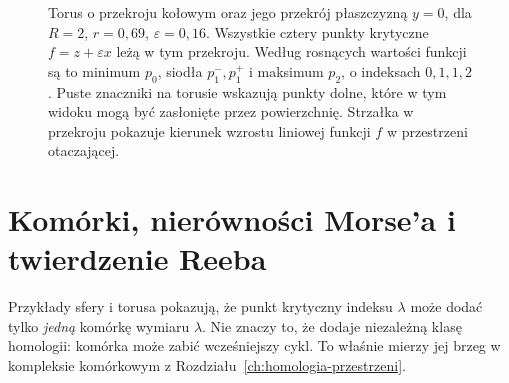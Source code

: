 \begin{figure}[H]
\caption{Torus o przekroju kołowym oraz jego przekrój płaszczyzną $y=0$,
dla $R=2$, $r=0{,}69$, $\varepsilon=0{,}16$.
Wszystkie cztery punkty krytyczne $f=z+\varepsilon x$
leżą w tym przekroju. Według rosnących wartości funkcji są to
minimum $p_0$, siodła $p_1^-,p_1^+$ i maksimum $p_2$,
o indeksach $0,1,1,2$.
Puste znaczniki na torusie wskazują punkty dolne,
które w tym widoku mogą być zasłonięte przez powierzchnię.
Strzałka w przekroju pokazuje kierunek wzrostu liniowej funkcji $f$
w przestrzeni otaczającej.}
\label{fig:torus-morse-17}
\end{figure}

\section{Komórki, nierówności Morse'a i twierdzenie Reeba}
\label{sec:nierownosci-morse-17}

Przykłady sfery i torusa pokazują, że
punkt krytyczny indeksu $\lambda$ może
dodać tylko \emph{jedną} komórkę wymiaru
$\lambda$. Nie znaczy to, że dodaje
niezależną klasę homologii:
komórka może zabić wcześniejszy cykl.
To właśnie mierzy jej brzeg w kompleksie
komórkowym z
Rozdziału~\ref{ch:homologia-przestrzeni}.

